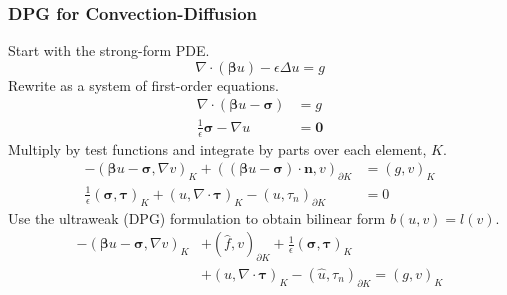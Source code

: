 \documentclass[mathserif]{beamer}
\def\btau{\boldsymbol\tau}
\def\bsigma{\boldsymbol\sigma}
\def\bbeta{\boldsymbol\beta}
\begin{document}
\begin{frame}
\frametitle{DPG for Convection-Diffusion}
Start with the strong-form PDE.
\[
\nabla\cdot(\bbeta u)-\epsilon\Delta u = g
\]
Rewrite as a system of first-order equations.
\begin{align*}
\nabla\cdot(\bbeta u-\bsigma)&=g\\
\frac{1}{\epsilon}\bsigma-\nabla u&=\boldsymbol0
\end{align*}
Multiply by test functions and integrate by parts over each element, $K$.
\begin{align*}
-(\bbeta u-\bsigma,\nabla v)_K+((\bbeta
u-\bsigma)\cdot\mathbf{n},v)_{\partial K}&=(g,v)_K\\
\frac{1}{\epsilon}(\bsigma,\btau)_K+(u,\nabla\cdot\btau)_K
-(u,\tau_n)_{\partial K}&=0
\end{align*}
Use the ultraweak (DPG) formulation to obtain bilinear form $b(u,v)=l(v)$.
\begin{align*}
-(\bbeta u-\bsigma,\nabla v)_K&+(\hat f,v)_{\partial K}
+ \frac{1}{\epsilon}(\bsigma,\btau)_K\\
&+(u,\nabla\cdot\btau)_K
-(\hat u,\tau_n)_{\partial K}=(g,v)_K
\end{align*}
\end{frame}

\end{document}
